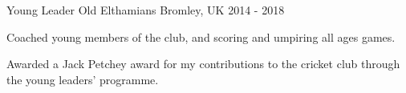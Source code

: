 \begin{cventries}

\cventry
{Young Leader} %
{Old Elthamians} %
{Bromley, UK} %
{2014 - 2018} %
{ %
\begin{cvitems}
\item {Coached young members of the club, and scoring and umpiring all ages games.}
\item {Awarded a Jack Petchey award for my contributions to the cricket club through the young leaders’ programme.}
\end{cvitems}
}



\end{cventries}